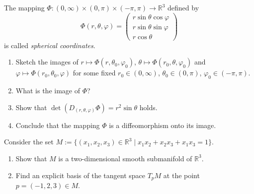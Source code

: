 
\begin{exercise}
\label{ex:spherical_coordinates_diffeomorphism}
The mapping $\Phi : (0,\infty)\times(0,\pi)\times(-\pi,\pi) \to \mathbb{R}^3$ defined by
\[\Phi(r,\theta,\varphi) = \begin{pmatrix} r\sin\theta\cos\varphi \\ r\sin\theta\sin\varphi \\ r\cos\theta \end{pmatrix}\]
is called \textit{spherical coordinates}.
\begin{enumerate}[label=\textbf{(\alph*)}]
  \item Sketch the images of $r \mapsto \Phi(r,\theta_0,\varphi_0)$, $\theta \mapsto
    \Phi(r_0,\theta,\varphi_0)$ and $\varphi \mapsto \Phi(r_0,\theta_0,\varphi)$ for some fixed
    $r_0 \in (0,\infty)$, $\theta_0 \in (0,\pi)$, $\varphi_0 \in (-\pi,\pi)$.
  \item What is the image of $\Phi$?
  \item Show that $\det(D_{(r,\theta,\varphi)}\Phi) = r^2\sin\theta$ holds.
  \item Conclude that the mapping $\Phi$ is a diffeomorphism onto its image.
\end{enumerate}
\end{exercise}

\begin{exercise}
\label{ex:submanifold_quadric_tangent_space}
Consider the set $M := \{(x_1,x_2,x_3) \in \mathbb{R}^3 \mid x_1 x_2 + x_2 x_3 + x_1 x_3 = 1\}$.
\begin{enumerate}[label=\textbf{(\alph*)}]
  \item Show that $M$ is a two-dimensional smooth submanifold of $\mathbb{R}^3$.
  \item Find an explicit basis of the tangent space $T_p M$ at the point $p = (-1, 2, 3) \in M$.
\end{enumerate}
\end{exercise}

